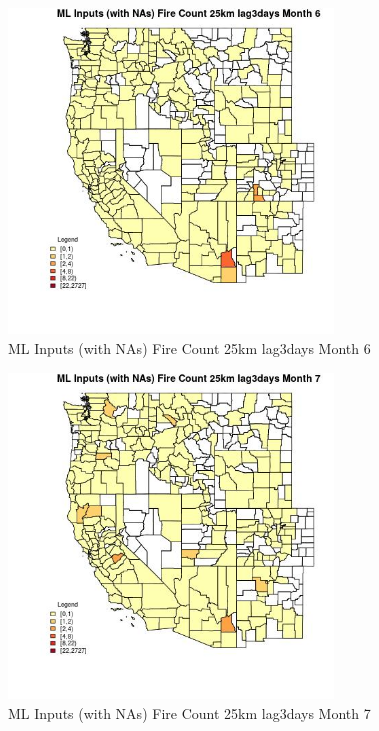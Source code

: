 \begin{figure} 
\centering  
\includegraphics[width=0.77\textwidth]{Code_Outputs/Report_ML_input_PM25_Step4_part_f_de_duplicated_aves_prioritize_24hr_obswNAs_CountyFire_Count_25km_lag3daysmedianMonth6.jpg} 
\caption{\label{fig:Report_ML_input_PM25_Step4_part_f_de_duplicated_aves_prioritize_24hr_obswNAsCountyFire_Count_25km_lag3daysmedianMonth6}ML Inputs (with NAs) Fire Count 25km lag3days Month 6} 
\end{figure} 
 

\clearpage 

\begin{figure} 
\centering  
\includegraphics[width=0.77\textwidth]{Code_Outputs/Report_ML_input_PM25_Step4_part_f_de_duplicated_aves_prioritize_24hr_obswNAs_CountyFire_Count_25km_lag3daysmedianMonth7.jpg} 
\caption{\label{fig:Report_ML_input_PM25_Step4_part_f_de_duplicated_aves_prioritize_24hr_obswNAsCountyFire_Count_25km_lag3daysmedianMonth7}ML Inputs (with NAs) Fire Count 25km lag3days Month 7} 
\end{figure} 
 

